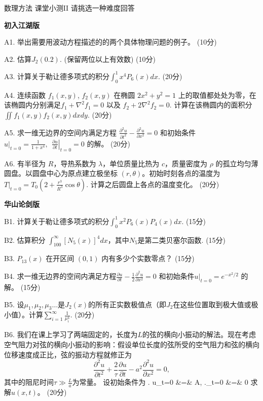 \documentclass[12pt,CJK]{article}
\def\mark#1{{\color{blue} (#1分)}}
\begin{document}
\bch
{\large 数理方法 课堂小测II 请挑选一种难度回答}

{\vskip 0.1in}

{\bf 初入江湖版}
\bitem
\item[A1.]{举出需要用波动方程描述的的两个具体物理问题的例子。\mark{10}}
\item[A2.]{估算$J_2(0.2).$ (保留两位以上有效数) \mark{10}}
\item[A3.]{计算关于勒让德多项式的积分$\int_0^1 x^4 P_6(x) dx.$  \mark{20}}
\item[A4.]{连续函数 $f_1(x,y)$, $f_2(x,y)$ 在椭圆 $2x^2+ y^2 = 1$ 上的取值都处处为零，在该椭圆内分别满足$f_1+ \nabla^2 f_1 = 0$ 以及 $f_2+2\nabla^2 f_2=0.$  计算在该椭圆内的面积分
  $\iint f_1(x,y)f_2(x,y) dx dy.$ \mark{20} }
\item[A5.]{求一维无边界的空间内满足方程
  $\frac{\partial^2u}{\partial t^2}-\frac{\partial^2u}{\partial x^2} = 0$ 和初始条件  $\left.u\right\vert_{t=0} = \frac{1}{1+x^4},\ \ \left.\frac{\partial u}{\partial t}\right\vert_{t=0} = 0$ 的解。\mark{20}}
\item[A6.]{有半径为 $R$，导热系数为 $\lambda$，单位质量比热为 $c$，质量密度为 $\rho$ 的孤立均匀薄圆盘。以圆盘中心为原点建立极坐标 $(r,\theta)$。初始时刻各点的温度为
  $\left.T\right\vert_{t=0}= T_0\left(2 + \frac{r^3}{R^3}\cos\theta\right).$
  计算之后圆盘上各点的温度变化。 \mark{20}}
  
  \eitem
  
{\vskip 0.1in}


{\bf 华山论剑版}
\bitem
\item[B1.]{计算关于勒让德多项式的积分$\int_0^1 x^2 P_6(x) P_4(x) dx.$ \mark{15}}  
\item[B2.]{估算积分 $\int_{100}^\infty \left[N_{5}(x)\right]^4 dx$，其中$N_5$是第二类贝塞尔函数.\mark{15}}

\item[B3.]{$P_{13}(x)$ 在开区间 $(0,1)$ 内有多少个实数零点？\mark{15}}
\item[B4.]{求一维无边界的空间内满足方程$\frac{\partial u}{\partial t} - \frac{1}{2}\frac{\partial^2u}{\partial x^2} = 0$ 和初始条件$\left.u\right\vert_{t=0} = e^{-x^2/2}$ 的解。\mark{15}}  
\item[B5.]{设$\mu_1,\mu_2,\mu_3\ldots$是$J_2(x)$的所有正实数极值点（即$J_2$在这些位置取到极大值或极小值）。计算$\sum_{i=1}^\infty \frac{1}{\mu_i^4}.$ \mark{20}}
\item[B6.]{我们在课上学习了两端固定的，长度为$L$的弦的横向小振动的解法。现在考虑空气阻力对弦的横向小振动的影响：假设单位长度的弦所受的空气阻力和弦的横向位移速度成正比，弦的振动方程就修正为
  $$ \frac{\partial^2 u}{\partial t^2} + \frac{2}{\tau} \frac{\partial u}{\partial t}-  a^2\frac{\partial^2u }{\partial x^2} =  0 , $$
  其中的阻尼时间$\tau \gg \frac{L}{a}$为常量。
  设初始条件为
  \bea
  \left. u\right\vert_{t=0} &=& A, \newl
  \left.\right\vert_{t=0} &=& 0
  \eea
  求解$u(x,t)$。 \mark{20}}
\eitem  
\end{document}
